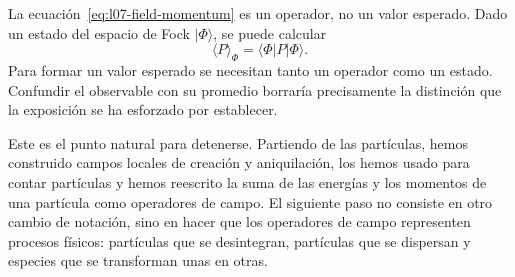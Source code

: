 La ecuación~\eqref{eq:l07-field-momentum} es un operador, no un valor esperado. Dado un estado del espacio de Fock \(|\Phi\rangle\), se puede calcular
\begin{equation}
\langle P\rangle_\Phi=\langle\Phi|P|\Phi\rangle.
\end{equation}
Para formar un valor esperado se necesitan tanto un operador como un estado. Confundir el observable con su promedio borraría precisamente la distinción que la exposición se ha esforzado por establecer.

\begin{classroomqa}
\end{classroomqa}

Este es el punto natural para detenerse. Partiendo de las partículas, hemos construido campos locales de creación y aniquilación, los hemos usado para contar partículas y hemos reescrito la suma de las energías y los momentos de una partícula como operadores de campo. El siguiente paso no consiste en otro cambio de notación, sino en hacer que los operadores de campo representen procesos físicos: partículas que se desintegran, partículas que se dispersan y especies que se transforman unas en otras.
